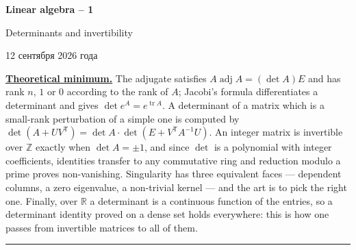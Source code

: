 \documentclass[11pt,a4paper]{article}
\newcommand{\head}[1]{\par\noindent\textbf{\underline{#1}}\quad}
\newcommand{\sheettitle}[4]{%
  \begin{center}
  {\huge\bfseries #1\par}\vspace{\dimexpr1.2em-1pt\relax minus 3.6pt}
  {\Large #2\par}\vspace{\dimexpr1em+1pt\relax minus 1.2pt}
  \if\relax\detokenize{#3}\relax\else{\Large #3\par}\vspace{\dimexpr1.15em-1pt\relax minus 3.6pt}\fi
  {\foreignlanguage{russian}{#4}\par}
  \end{center}\vspace{0.5pt minus 1.2pt}}
\DeclareMathOperator{\tr}{tr}
\DeclareMathOperator{\adj}{adj}
\newcommand{\T}{\mathsf T}
\begin{document}
\sheettitle{Linear algebra -- 1}{Determinants and invertibility}{Homework}{12 сентября 2026 года}

\head{Theoretical minimum.} The adjugate satisfies $A\adj A=(\det A)E$ and has rank $n$, $1$ or
$0$ according to the rank of $A$; Jacobi's formula differentiates a determinant and gives
$\det e^A=e^{\tr A}$. A determinant of a matrix which is a small-rank perturbation of a simple one
is computed by $\det(A+UV^\T)=\det A\cdot\det(E+V^\T A^{-1}U)$. An integer matrix is invertible
over $\mathbb Z$ exactly when $\det A=\pm1$, and since $\det$ is a polynomial with integer
coefficients, identities transfer to any commutative ring and reduction modulo a prime proves
non-vanishing. Singularity has three equivalent faces --- dependent columns, a zero eigenvalue, a
non-trivial kernel --- and the art is to pick the right one. Finally, over $\mathbb R$ a
determinant is a continuous function of the entries, so a determinant identity proved on a dense
set holds everywhere: this is how one passes from invertible matrices to all of them.

\par\vspace{-1pt}\noindent\rule{\linewidth}{0.4pt}\par\vspace{7pt}
\end{document}
